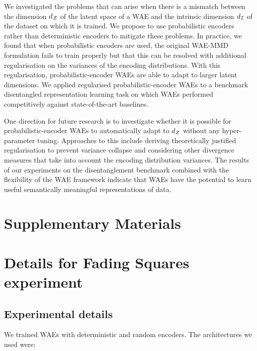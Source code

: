 \vspace{-0.2cm}

We investigated the problems that can arise when there is a mismatch between the dimension $d_{\mathcal{Z}}$ of the latent space of a WAE and the intrinsic dimension $d_\mathcal{I}$ of the dataset on which it is trained. 
We propose to use probabilistic encoders rather than deterministic encoders to mitigate these problems.
In practice, we found that when probabilistic encoders are used, the original WAE-MMD formulation fails to train properly but that this can be resolved with additional regularisation on the variances of the encoding distributions.
With this regularisation, probabilistic-encoder WAEs are able to adapt to larger latent dimensions.
We applied regularised probabilistic-encoder WAEs to a benchmark disentangled representation learning task on which WAEs performed competitively against state-of-the-art baselines.

One direction for future research is to investigate whether it is possible for probabilistic-encoder WAEs to automatically adapt to $d_{\mathcal{Z}}$ without any hyper-parameter tuning. 
Approaches to this include deriving theoretically justified regularisation to prevent variance collapse and considering other divergence measures that take into account the encoding distribution variances.
The results of our experiments on the disentanglement benchmark combined with the flexibility of the WAE framework indicate that WAEs have the potential to learn useful semantically meaningful representations of data.

%
%
%

\section*{Supplementary Materials}

\section{Details for Fading Squares experiment}\label{appendix:fading_squares}

\subsection{Experimental details}

We trained WAEs with deterministic and random encoders. The architectures we used were:

